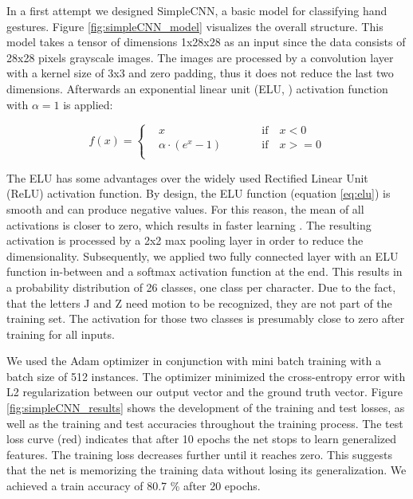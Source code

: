 \documentclass[a4paper]{article}
\begin{document}
In a first attempt we designed SimpleCNN, a basic model for classifying hand gestures. Figure \ref{fig:simpleCNN_model} visualizes the overall structure. This model takes a tensor of dimensions 1x28x28 as an input since the data consists of 28x28 pixels grayscale images. The images are processed by a convolution layer with a kernel size of 3x3 and zero padding, thus it does not reduce the last two dimensions. Afterwards an exponential linear unit (ELU, \cite{clevert2015fast}) activation function with $\alpha = 1$ is applied:
\vspace{-0.2cm}

\begin{equation}\label{eq:elu}
f(x) = \left\{\begin{alignedat}{2}
    & x && \qquad \text{if} \quad x < 0\\
    & \alpha \cdot (e^x - 1) && \qquad \text{if} \quad x >= 0\\
  \end{alignedat}\right.
\end{equation}

The ELU has some advantages over the widely used Rectified Linear Unit (ReLU) activation function. By design, the ELU function (equation \ref{eq:elu}) is smooth and can produce negative values. For this reason, the mean of all activations is closer to zero, which results in faster learning \cite{clevert2015fast}.
The resulting activation is processed by a 2x2 max pooling layer in order to reduce the dimensionality. Subsequently, we applied two fully connected layer with an ELU function in-between and a softmax activation function at the end. This results in a probability distribution of 26 classes, one class per character. Due to the fact, that the letters J and Z need motion to be recognized, they are not part of the training set. The activation for those two classes is presumably close to zero after training for all inputs.

We used the Adam optimizer \cite{Kingma2014} in conjunction with mini batch training with a batch size of 512 instances. The optimizer minimized the cross-entropy error with L2 regularization between our output vector and the ground truth vector. 
Figure \ref{fig:simpleCNN_results} shows the development of the training and test losses, as well as the training and test accuracies throughout the training process. The test loss curve (red) indicates that after 10 epochs the net stops to learn generalized features. The training loss decreases further until it reaches zero. This suggests that the net is memorizing the training data without losing its generalization. We achieved a train accuracy of 80.7 \% after 20 epochs.
\end{document}
